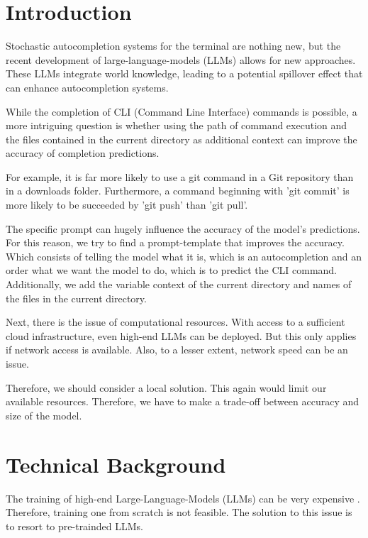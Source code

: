 \section{Introduction}

Stochastic autocompletion systems for the terminal are nothing new, but the recent development of large-language-models (LLMs) allows for new approaches. These LLMs integrate world knowledge, leading to a potential spillover effect that can enhance autocompletion systems.



While the completion of CLI (Command Line Interface) commands is possible, a more intriguing question is whether using the path of command execution and the files contained in the current directory as additional context can improve the accuracy of completion predictions.


For example, it is far more likely to use a git command in a Git repository than in a downloads folder. Furthermore, a command beginning with 'git commit' is more likely to be succeeded by 'git push' than 'git pull'.



The specific prompt can hugely influence the accuracy of the model's predictions.
For this reason, we try to find a prompt-template that improves the accuracy.
Which consists of telling the model what it is, which is an autocompletion and an order what we want the model to do, which is to predict the CLI command. Additionally, we add the variable context of the current directory and names of the files in the current directory. 



Next, there is the issue of computational resources. With access to a sufficient cloud infrastructure, even high-end LLMs can be deployed. But this only applies if network access is available. Also, to a lesser extent, network speed can be an issue. 

Therefore, we should consider a local solution. This again would limit our available resources. Therefore, we have to make a trade-off between accuracy and size of the model.

\section{Technical Background}

The training of high-end Large-Language-Models (LLMs) can be very expensive \cite{sharir2020cost}. Therefore, training one from scratch is not feasible.
The solution to this issue is to resort to pre-trainded LLMs. 


